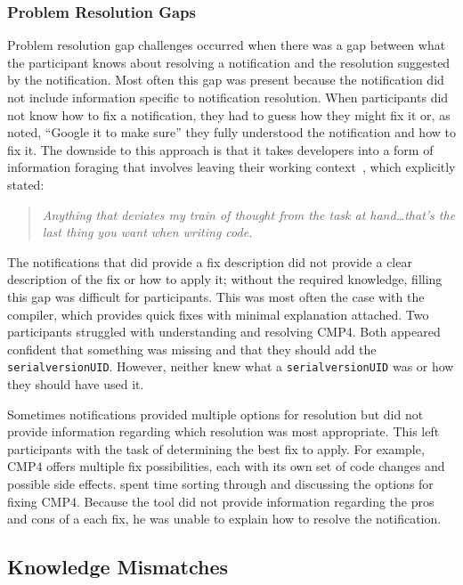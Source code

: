 \subsubsection{Problem Resolution Gaps}\label{subsec:resolution}
Problem resolution gap challenges occurred when there was a gap between what the participant knows about resolving a notification and the resolution suggested by the notification. Most often this gap was present because the notification did not include information specific to notification resolution.
When participants did not know how to fix a notification, they had to guess how they might fix it or, as  noted, ``Google it to make sure'' they fully understood the notification and how to fix it. 
The downside to this approach is that it takes developers into a form of information foraging that involves leaving their working context~\cite{Altmann:2004:Task}, which  explicitly stated:

\begin{quote}
	\textit{Anything that deviates my train of thought from the task at hand\ldots that's the last thing you want when writing code.}
\end{quote}

\noindent
The notifications that did provide a fix description did not provide a clear description of the fix or how to apply it; without the required knowledge, filling this gap was difficult for participants.
This was most often the case with the compiler, which provides quick fixes with minimal explanation attached.
Two participants struggled with understanding and resolving CMP4. Both appeared confident that something was missing and that they should add the \texttt{serialversionUID}. However, neither knew what a \texttt{serialversionUID} was or how they should have used it. 

Sometimes notifications provided multiple options for resolution but did not provide information regarding which resolution was most appropriate. This left participants with the task of determining the best fix to apply. For example, CMP4 offers multiple fix possibilities, each with its own set of code changes and possible side effects.  spent time sorting through and discussing the options for fixing CMP4. Because the tool did not provide information regarding the pros and cons of a each fix, he was unable to explain how to resolve the notification.

\subsection{Knowledge Mismatches}\label{subsec:mismatch}


